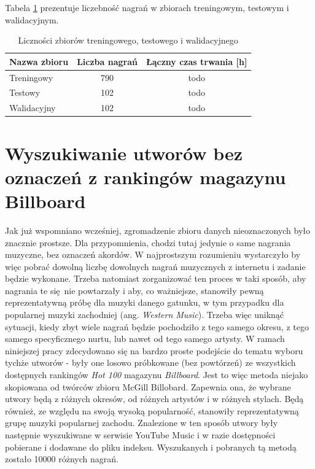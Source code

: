 Tabela \ref{tab:datasets3} prezentuje liczebność nagrań w zbiorach treningowym, testowym i
walidacyjnym.

\begin{table}
    \centering
    \caption{Liczności zbiorów treningowego, testowego i walidacyjnego}
    \label{tab:datasets3}
    \begin{tabular}{|l|c|c|}
        \hline
        Nazwa zbioru & Liczba nagrań & Łączny czas trwania [h] \\
        \hline
        Treningowy  & 790 & todo \\
        Testowy     & 102 & todo \\
        Walidacyjny & 102 & todo \\
        \hline
    \end{tabular}
\end{table}


\section{Wyszukiwanie utworów bez oznaczeń z rankingów magazynu Billboard}

Jak już wspomniano wcześniej, zgromadzenie zbioru danych nieoznaczonych było znacznie prostsze. Dla
przypomnienia, chodzi tutaj jedynie o same nagrania muzyczne, bez oznaczeń akordów. W najprostszym
rozumieniu wystarczyło by więc pobrać dowolną liczbę dowolnych nagrań muzycznych z internetu i
zadanie będzie wykonane. Trzeba natomiast zorganizować ten proces w taki sposób, aby nagrania te
się nie powtarzały i aby, co ważniejsze, stanowiły pewną reprezentatywną próbę dla muzyki danego
gatunku, w tym przypadku dla popularnej muzyki zachodniej (ang. \emph{Western Music}). Trzeba więc
uniknąć sytuacji, kiedy zbyt wiele nagrań będzie pochodziło z tego samego okresu, z tego samego
specyficznego nurtu, lub nawet od tego samego artysty. W ramach niniejszej pracy zdecydowano się na
bardzo proste podejście do tematu wyboru tychże utworów - były one losowo próbkowane (bez powtórzeń)
ze wszystkich dostępnych rankingów \emph{Hot 100} magazynu \emph{Billboard}. Jest to więc metoda
niejako skopiowana od twórców zbioru McGill Billobard. Zapewnia ona, że wybrane utwory będą z
różnych okresów, od różnych artystów i w różnych stylach. Będą również, ze względu na swoją wysoką
popularność, stanowiły reprezentatywną grupę muzyki popularnej zachodu. Znalezione w ten sposób
utwory były następnie wyszukiwane w serwisie YouTube Music i w razie dostępności pobierane i
dodawane do pliku indeksu. Wyszukanych i pobranych tą metodą zostało 10000 różnych nagrań.

